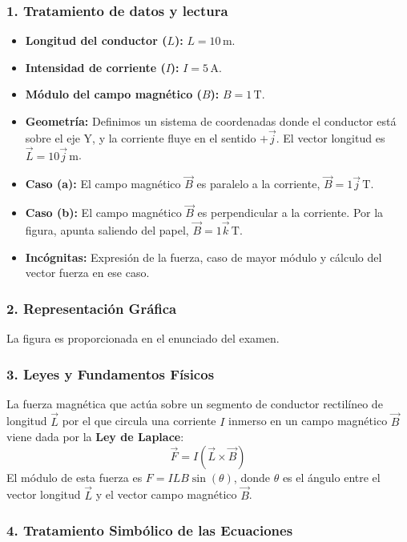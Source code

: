 \subsubsection*{1. Tratamiento de datos y lectura}
\begin{itemize}
    \item \textbf{Longitud del conductor ($L$):} $L=10\,\text{m}$.
    \item \textbf{Intensidad de corriente ($I$):} $I=5\,\text{A}$.
    \item \textbf{Módulo del campo magnético ($B$):} $B=1\,\text{T}$.
    \item \textbf{Geometría:} Definimos un sistema de coordenadas donde el conductor está sobre el eje Y, y la corriente fluye en el sentido $+\vec{j}$. El vector longitud es $\vec{L} = 10\vec{j}\,\text{m}$.
    \item \textbf{Caso (a):} El campo magnético $\vec{B}$ es paralelo a la corriente, $\vec{B}=1\vec{j}\,\text{T}$.
    \item \textbf{Caso (b):} El campo magnético $\vec{B}$ es perpendicular a la corriente. Por la figura, apunta saliendo del papel, $\vec{B}=1\vec{k}\,\text{T}$.
    \item \textbf{Incógnitas:} Expresión de la fuerza, caso de mayor módulo y cálculo del vector fuerza en ese caso.
\end{itemize}

\subsubsection*{2. Representación Gráfica}
La figura es proporcionada en el enunciado del examen.

\subsubsection*{3. Leyes y Fundamentos Físicos}
La fuerza magnética que actúa sobre un segmento de conductor rectilíneo de longitud $\vec{L}$ por el que circula una corriente $I$ inmerso en un campo magnético $\vec{B}$ viene dada por la \textbf{Ley de Laplace}:
$$\vec{F} = I(\vec{L} \times \vec{B})$$
El módulo de esta fuerza es $F = I L B \sin(\theta)$, donde $\theta$ es el ángulo entre el vector longitud $\vec{L}$ y el vector campo magnético $\vec{B}$.

\subsubsection*{4. Tratamiento Simbólico de las Ecuaciones}
